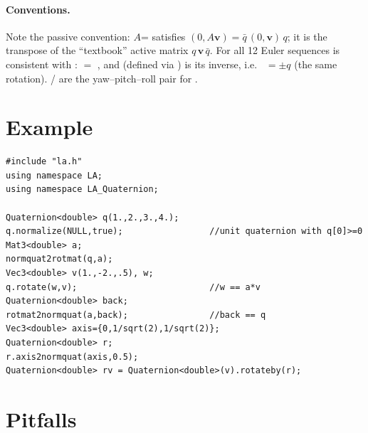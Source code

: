 \paragraph{Conventions.} Note the passive convention: $A$= satisfies
$(0,A\mathbf v)=\bar q\,(0,\mathbf v)\,q$; it is the transpose of the ``textbook'' active matrix
$q\,\mathbf v\,\bar q$. For all 12 Euler sequences  is consistent with
:  $=$ , and  (defined via
) is its inverse, i.e.\  $=\pm q$
(the same rotation). / are the yaw--pitch--roll pair for .

\section{Example}
\begin{lstlisting}
#include "la.h"
using namespace LA;
using namespace LA_Quaternion;

Quaternion<double> q(1.,2.,3.,4.);
q.normalize(NULL,true);                 //unit quaternion with q[0]>=0
Mat3<double> a;
normquat2rotmat(q,a);
Vec3<double> v(1.,-2.,.5), w;
q.rotate(w,v);                          //w == a*v
Quaternion<double> back;
rotmat2normquat(a,back);                //back == q
Vec3<double> axis={0,1/sqrt(2),1/sqrt(2)};
Quaternion<double> r;
r.axis2normquat(axis,0.5);
Quaternion<double> rv = Quaternion<double>(v).rotateby(r);
\end{lstlisting}

\section{Pitfalls}
